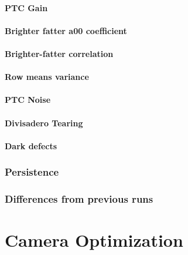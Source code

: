 \paragraph{PTC Gain}\label{ptc-gain-1}

\paragraph{\texorpdfstring{Brighter fatter a{00}
coefficient}{Brighter fatter a00 coefficient}}\label{brighter-fatter-a00-coefficient-1}

\paragraph{Brighter-fatter
correlation}\label{brighter-fatter-correlation}

\paragraph{Row means variance}\label{row-means-variance}

\paragraph{PTC Noise}\label{ptc-noise}

\paragraph{Divisadero Tearing}\label{divisadero-tearing-1}

\paragraph{Dark defects}\label{dark-defects-1}

\subsubsection{Persistence}\label{persistence-1}

\subsubsection{Differences from previous
runs}\label{differences-from-previous-runs-1}

\section{Camera Optimization}\label{camera-optimization}

